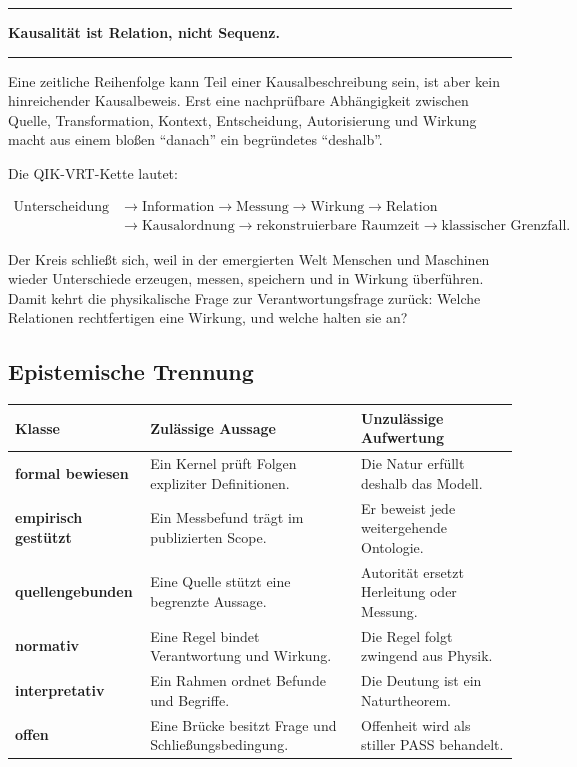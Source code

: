 \documentclass[11pt,a4paper]{article}
\newenvironment{claimbox}{%
  \begin{center}\begin{minipage}{0.92\textwidth}
  \color{qikblue}\hrule\vspace{0.7em}\color{black}
}{%
  \vspace{0.7em}\color{qikblue}\hrule\end{minipage}\end{center}
}
\begin{document}
\begin{claimbox}
\begin{center}
\Large\textbf{Kausalität ist Relation, nicht Sequenz.}
\end{center}
\end{claimbox}

Eine zeitliche Reihenfolge kann Teil einer Kausalbeschreibung sein, ist aber
kein hinreichender Kausalbeweis. Erst eine nachprüfbare Abhängigkeit zwischen
Quelle, Transformation, Kontext, Entscheidung, Autorisierung und Wirkung macht
aus einem bloßen ``danach'' ein begründetes ``deshalb''.

Die QIK-VRT-Kette lautet:

\[
\begin{aligned}
\text{Unterscheidung}
&\to\text{Information}
\to\text{Messung}
\to\text{Wirkung}
\to\text{Relation}\\
&\to\text{Kausalordnung}
\to\text{rekonstruierbare Raumzeit}
\to\text{klassischer Grenzfall}.
\end{aligned}
\]

Der Kreis schließt sich, weil in der emergierten Welt Menschen und Maschinen
wieder Unterschiede erzeugen, messen, speichern und in Wirkung überführen.
Damit kehrt die physikalische Frage zur Verantwortungsfrage zurück: Welche
Relationen rechtfertigen eine Wirkung, und welche halten sie an?

\subsection{Epistemische Trennung}

\begin{longtable}{>{\bfseries}p{}p{}p{}}
\toprule
Klasse & Zulässige Aussage & Unzulässige Aufwertung \\
\midrule
\endhead
formal bewiesen & Ein Kernel prüft Folgen expliziter Definitionen. & Die Natur erfüllt deshalb das Modell. \\
empirisch gestützt & Ein Messbefund trägt im publizierten Scope. & Er beweist jede weitergehende Ontologie. \\
quellengebunden & Eine Quelle stützt eine begrenzte Aussage. & Autorität ersetzt Herleitung oder Messung. \\
normativ & Eine Regel bindet Verantwortung und Wirkung. & Die Regel folgt zwingend aus Physik. \\
interpretativ & Ein Rahmen ordnet Befunde und Begriffe. & Die Deutung ist ein Naturtheorem. \\
offen & Eine Brücke besitzt Frage und Schließungsbedingung. & Offenheit wird als stiller PASS behandelt. \\
\bottomrule
\end{longtable}
\end{document}
